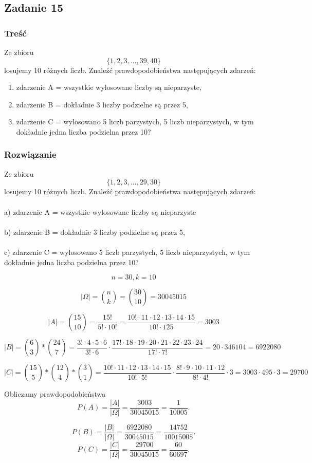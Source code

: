 \subsection{Zadanie 15}

\subsubsection*{Treść}
Ze zbioru 
$$
\{1, 2, 3, ... , 39, 40\}
$$
 losujemy 10 różnych liczb. Znaleźć prawdopodobieństwa następujących zdarzeń:
\begin{enumerate}[label=\alph*)] 
\item zdarzenie A = { wszystkie wylosowane liczby są nieparzyste},
\item zdarzenie B = { dokładnie 3 liczby podzielne są przez 5},
\item zdarzenie C = { wylosowano 5 liczb parzystych, 5 liczb nieparzystych, w tym dokładnie jedna liczba podzielna przez 10}?
\end{enumerate}

\subsubsection*{Rozwiązanie}
Ze zbioru
\[
 \{1, 2, 3,... ,29, 30\}
\]
 losujemy 10 różnych liczb. Znaleźć prawdopodobieństwa następujących zdarzeń:
 \\
\\a) zdarzenie A = wszystkie wylosowane liczby są nieparzyste
\\
\\ b) zdarzenie B = dokładnie 3 liczby podzielne są przez 5,
\\
\\ c) zdarzenie C = wylosowano 5 liczb parzystych, 5 liczb nieparzystych, w tym dokładnie jedna liczba podzielna przez 10?

\[
n=30,k=10
\]

\[
|\Omega|={n \choose k}={30 \choose 10} = 30045015
\]

\[
|A|={15 \choose 10} = \frac{15!}{5!\cdot10!} = \frac{10 !\cdot 11 \cdot 12 \cdot 13 \cdot 14 \cdot 15}{10! \cdot 125} = 3003
\]

\[
|B|={6 \choose 3} * {24 \choose 7} = \frac{3! \cdot 4 \cdot 5 \cdot 6}{3! \cdot 6} \cdot \frac{17!\cdot18\cdot19\cdot20\cdot21\cdot22\cdot23\cdot24}{17!\cdot7!}= 20 \cdot 346104 = 6 922 080 
\]

\[|C|={15 \choose 5} * {12 \choose 4} * {3 \choose 1} = \frac{10! \cdot 11 \cdot 12 \cdot 13 \cdot 14 \cdot 15}{10! \cdot 5!}  \cdot \frac{8!\cdot9\cdot10\cdot11\cdot12}{8!\cdot4!} \cdot 3= 3003 \cdot 495 \cdot 3 = 29 700\]

Obliczamy prawdopodobieństwa
\[
P(A)=\frac{|A|}{|\Omega|}=\frac{3003}{30045015}=\frac{1}{10005}.
\]

\[
P(B)=\frac{|B|}{|\Omega|}=\frac{ 6 922 080 }{30045015}=\frac{14752}{10 015 005}.
\]
\[
P(C)=\frac{|C|}{|\Omega|}=\frac{ 29 700}{30045015}=\frac{60}{60697}.
\]

